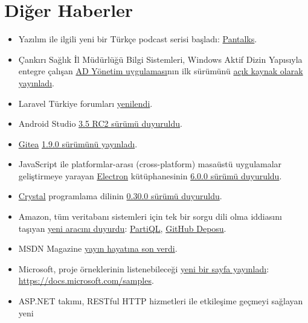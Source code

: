 \documentclass[11pt]{article}
\begin{document}
\section{Diğer Haberler}
\label{sec:org87be24d}
\begin{itemize}
\item Yazılım ile ilgili yeni bir Türkçe podcast serisi başladı: \href{https://www.youtube.com/watch?v=Pi4YaFXgYRE}{Pantalks}.
\item Çankırı Sağlık İl Müdürlüğü Bilgi Sistemleri, Windows Aktif Dizin Yapısıyla
entegre çalışan \href{https://github.com/Cankirism/ADManager}{AD Yönetim uygulaması}nın ilk sürümünü \href{https://twitter.com/csmbilsis/status/1157205580672622592}{açık kaynak olarak
yayınladı}.
\item Laravel Türkiye forumları \href{https://laravel.gen.tr/d/3383-laravel-turkiye-forumlari-yenilendi}{yenilendi}.
\item Android Studio \href{https://androidstudio.googleblog.com/2019/08/android-studio-35-release-candidate-2.html}{3.5 RC2 sürümü duyuruldu}.
\item \href{https://gitea.io/}{Gitea} \href{https://blog.gitea.io/2019/07/gitea-1.9.0-is-released/}{1.9.0 sürümünü yayınladı}.
\item JavaScript ile platformlar-arası (cross-platform) masaüstü uygulamalar
geliştirmeye yarayan \href{https://electronjs.org/}{Electron} kütüphanesinin \href{https://electronjs.org/blog/electron-6-0}{6.0.0 sürümü duyuruldu}.
\item \href{https://crystal-lang.org/}{Crystal} programlama dilinin \href{https://crystal-lang.org/2019/08/01/crystal-0.30.0-released.html}{0.30.0 sürümü duyuruldu}.
\item Amazon, tüm veritabanı sistemleri için tek bir sorgu dili olma iddiasını
taşıyan \href{https://aws.amazon.com/tr/blogs/opensource/announcing-partiql-one-query-language-for-all-your-data/}{yeni aracını duyurdu}: \href{https://partiql.org/}{PartiQL}, \href{https://github.com/partiql/partiql-lang-kotlin}{GitHub Deposu}.
\item MSDN Magazine \href{https://msdn.microsoft.com/en-us/magazine/mt833502.aspx?f=255\&MSPPError=-2147217396}{yayın hayatına son verdi}.
\item Microsoft, proje örneklerinin listenebileceği \href{https://docs.microsoft.com/en-us/teamblog/code-samples}{yeni bir sayfa yayınladı}:
\url{https://docs.microsoft.com/samples}.
\item ASP.NET takımı, RESTful HTTP hizmetleri ile etkileşime geçmeyi sağlayan yeni

\end{itemize}
\end{document}
